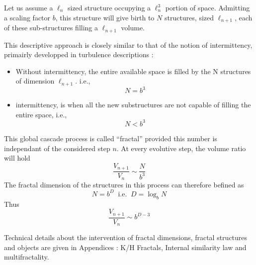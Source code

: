 Let us assume a $\ell_n$ sized structure occupying a  $\ell_n^3$ portion of space.
Admitting a scaling factor $b$, this structure will give birth to $N$ structures, sized $\ell_{n+1}$, each of these sub-structures filling a $\ell_{n+1}$ volume.

This descriptive approach is closely similar to that of the notion of intermittency, primairly developped in turbulence descriptions :

\begin{itemize}
    \item Without intermittency, the entire available space is filled by the N structures of dimension $\ell_{n+1}$. i.e., $$N=b^3$$
    \item intermittency, is when all the new substructures are not capable of filling the entire space, i.e., $$N<b^3$$
\end{itemize}

This global cascade process is called ``fractal'' provided this number is independant of the considered step $n$. At every evolutive step, the volume ratio will hold
\begin{equation}
    \frac{V_{n+1}}{V_n}\sim\frac{N}{b^3}
\end{equation}
The fractal dimension of the structures in this process can therefore befined as 
\begin{equation}
    N=b^D\;\;\text{i.e.}\;\;D=\log_b{N}
\end{equation}
Thus
\begin{equation}
        \frac{V_{n+1}}{V_n}\sim b^{D-3}
\end{equation}

Technical details about the intervention of fractal dimensions, fractal structures and objects are given in Appendices : K/H Fractals, Internal similarity law and multifractality.

